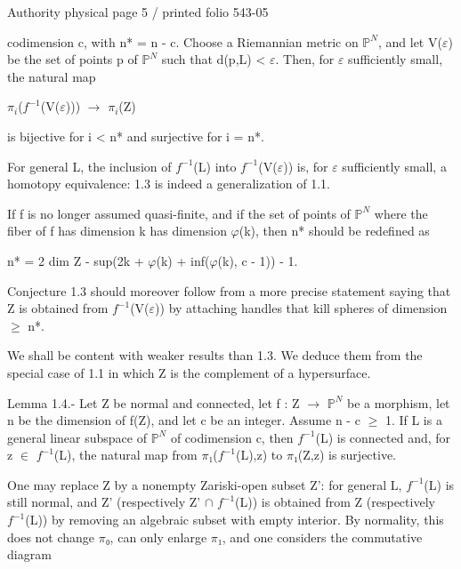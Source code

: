 \documentclass[10pt,a4paper]{article}
\begin{document}
\noindent\begin{adjustbox}{max totalsize={\textwidth}{0.945\textheight},center}
\begin{minipage}{\textwidth}
\noindent\hfill\scriptsize Authority physical page 5 / printed folio 543-05\par\normalsize
\noindent codimension c, with n* = n - c. Choose a Riemannian metric on \ensuremath{ℙ^N}, and let V(\ensuremath{ε}) be the set of points p of \ensuremath{ℙ^N} such that d(p,L) < \ensuremath{ε}. Then, for \ensuremath{ε} sufficiently small, the natural map\par\smallskip
\noindent \ensuremath{π_i}(\ensuremath{f^{-1}}(V(\ensuremath{ε}))) \ensuremath{→} \ensuremath{π_i}(Z)\par\smallskip
\noindent is bijective for i < n* and surjective for i = n*.\par\smallskip
\noindent For general L, the inclusion of \ensuremath{f^{-1}}(L) into \ensuremath{f^{-1}}(V(\ensuremath{ε})) is, for \ensuremath{ε} sufficiently small, a homotopy equivalence: 1.3 is indeed a generalization of 1.1.\par\smallskip
\noindent If f is no longer assumed quasi-finite, and if the set of points of \ensuremath{ℙ^N} where the fiber of f has dimension k has dimension \ensuremath{φ}(k), then n* should be redefined as\par\smallskip
\noindent n* = 2 dim Z - sup(2k + \ensuremath{φ}(k) + inf(\ensuremath{φ}(k), c - 1)) - 1.\par\smallskip
\noindent Conjecture 1.3 should moreover follow from a more precise statement saying that Z is obtained from \ensuremath{f^{-1}}(V(\ensuremath{ε})) by attaching handles that kill spheres of dimension \ensuremath{≥} n*.\par\smallskip
\noindent We shall be content with weaker results than 1.3. We deduce them from the special case of 1.1 in which Z is the complement of a hypersurface.\par\smallskip
\noindent Lemma 1.4.- Let Z be normal and connected, let f : Z \ensuremath{→} \ensuremath{ℙ^N} be a morphism, let n be the dimension of f(Z), and let c be an integer. Assume n - c \ensuremath{≥} 1. If L is a general linear subspace of \ensuremath{ℙ^N} of codimension c, then \ensuremath{f^{-1}}(L) is connected and, for z \ensuremath{∈} \ensuremath{f^{-1}}(L), the natural map from \ensuremath{π₁}(\ensuremath{f^{-1}}(L),z) to \ensuremath{π₁}(Z,z) is surjective.\par\smallskip
\noindent One may replace Z by a nonempty Zariski-open subset Z': for general L, \ensuremath{f^{-1}}(L) is still normal, and Z' (respectively Z' \ensuremath{∩} \ensuremath{f^{-1}}(L)) is obtained from Z (respectively \ensuremath{f^{-1}}(L)) by removing an algebraic subset with empty interior. By normality, this does not change \ensuremath{π₀}, can only enlarge \ensuremath{π₁}, and one considers the commutative diagram\par\smallskip

\end{minipage}
\end{adjustbox}
\end{document}
